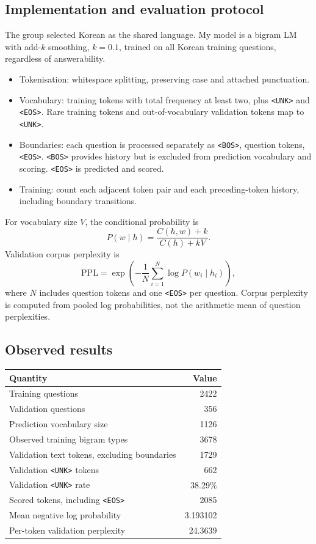 \documentclass[11pt,a4paper]{article}
\newcommand{\unk}{\texttt{<UNK>}}
\newcommand{\bos}{\texttt{<BOS>}}
\newcommand{\eos}{\texttt{<EOS>}}
\begin{document}
\subsection{Implementation and evaluation protocol}
The group selected Korean as the shared language. My model is a bigram LM with add-$k$ smoothing, $k=0.1$, trained on all Korean training questions, regardless of answerability.
\begin{itemize}
\item Tokenisation: whitespace splitting, preserving case and attached punctuation.
\item Vocabulary: training tokens with total frequency at least two, plus \unk{} and \eos{}. Rare training tokens and out-of-vocabulary validation tokens map to \unk{}.
\item Boundaries: each question is processed separately as \bos{}, question tokens, \eos{}. \bos{} provides history but is excluded from prediction vocabulary and scoring. \eos{} is predicted and scored.
\item Training: count each adjacent token pair and each preceding-token history, including boundary transitions.
\end{itemize}
For vocabulary size $V$, the conditional probability is
\[
P(w\mid h)=\frac{C(h,w)+k}{C(h)+kV}.
\]
Validation corpus perplexity is
\[
\mathrm{PPL}=\exp\left(-\frac{1}{N}\sum_{i=1}^{N}\log P(w_i\mid h_i)\right),
\]
where $N$ includes question tokens and one \eos{} per question. Corpus perplexity is computed from pooled log probabilities, not the arithmetic mean of question perplexities.

\subsection{Observed results}
\begin{center}
\begin{tabular}{lr}
\toprule
Quantity & Value \\
\midrule
Training questions & 2422 \\
Validation questions & 356 \\
Prediction vocabulary size & 1126 \\
Observed training bigram types & 3678 \\
Validation text tokens, excluding boundaries & 1729 \\
Validation \unk{} tokens & 662 \\
Validation \unk{} rate & 38.29\% \\
Scored tokens, including \eos{} & 2085 \\
Mean negative log probability & 3.193102 \\
Per-token validation perplexity & 24.3639 \\
\bottomrule
\end{tabular}
\end{center}
\end{document}
